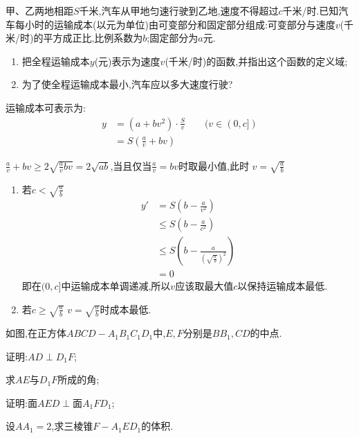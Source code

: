 \begin{questions}
	\question
	甲、乙两地相距$S$千米,汽车从甲地匀速行驶到乙地,速度不得超过$c$千米/时.已知汽车每小时的运输成本(以元为单位)由可变部分和固定部分组成:可变部分与速度$v$(千米/时)的平方成正比,比例系数为$b$;固定部分为$a$元.
	\begin{enumerate}[label=(\arabic*)]
		\item 把全程运输成本$y$(元)表示为速度$v$(千米/时)的函数,并指出这个函数的定义域;
		\item 为了使全程运输成本最小,汽车应以多大速度行驶?
	\end{enumerate}
	\pagebreak
	\begin{solution}
		\begin{penum}
			\item 运输成本可表示为:
			      \begin{align*}
				      y & = (a + bv^2)\cdot \frac{S}{v} \qquad(v \in (0,c]) \\
				        & = S(\frac{a}{v}+ bv)
			      \end{align*}
			\item $\frac{a}{v} + bv \geqslant 2\sqrt{\frac{a}{v}bv} = 2\sqrt{ab}$,当且仅当$\frac{a}{v} =
				      bv$时取最小值,此时 $v=\sqrt{\frac{a}{b}}$
			      \begin{enumerate}[label=\protect\circled{\arabic*}]
				      \item 若$c<\sqrt{\frac{a}{b}}$
				            \begin{align*}
					            y' & = S(b - \frac{a}{v^2})                            \\
					               & \leqslant S(b - \frac{a}{c^2})                    \\
					               & \leqslant S(b - \frac{a}{(\sqrt{\frac{a}{b}})^2}) \\
					               & = 0
				            \end{align*}
				            即在$(0,c]$中运输成本单调递减,所以$v$应该取最大值$c$以保持运输成本最低.
				      \item 若$c\geqslant\sqrt{\frac{a}{b}}$
				            $v=\sqrt{\frac{a}{b}}$时成本最低.
			      \end{enumerate}
		\end{penum}

	\end{solution}

	\question 如图,在正方体$ABCD-A_1B_1C_1D_1$中,$E,F$分别是$BB_1,CD$的中点.
	\begin{penum}
		\item 证明:$AD\perp D_1F$;
		\item 求$AE$与$D_1F$所成的角;
		\item 证明:面$AED\perp$面$A_1FD_1$;
		\item 设$AA_1=2$,求三棱锥$F-A_1ED_1$的体积.
	\end{penum}


\end{questions}
